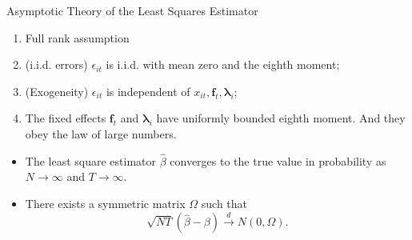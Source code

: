 \documentclass{beamer}
\begin{document}
\begin{frame}{Asymptotic Theory of the Least Squares Estimator}
    \begin{enumerate}

        \item Full rank assumption
        \item (i.i.d. errors) $\epsilon_{it}$ is i.i.d. with mean zero and the eighth moment;
        \item (Exogeneity) $\epsilon_{it}$ is independent of $x_{it}, \boldsymbol f_t, \boldsymbol \lambda_i$;
        \item The fixed effects $\boldsymbol f_t$ and $\boldsymbol \lambda_i$ have uniformly bounded eighth moment. And they obey the law of large numbers.
    \end{enumerate}
    \begin{itemize}
        \item The least square estimator $\hat \beta$ converges to the true value in probability as $N \to \infty$ and $T \to \infty$.
        \item There exists a symmetric matrix $\Omega$ such that
        \[
            \sqrt{NT}(\hat \beta-\beta)\xrightarrow{d}N(0,\Omega).
        \]
    \end{itemize}
\end{frame}






\end{document}

